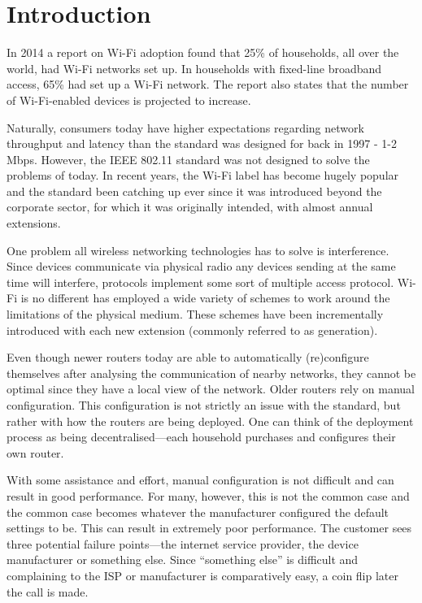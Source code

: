 \chapter{Introduction}

In 2014 a report on Wi-Fi adoption found that 25\% of households, all over the world, had Wi-Fi networks set up. In households with fixed-line broadband access, 65\% had set up a Wi-Fi network\cite{smith}. The report also states that the number of Wi-Fi-enabled devices is projected to increase. 

Naturally, consumers today have higher expectations regarding network throughput and latency than the standard was designed for back in 1997 - 1-2 Mbps. However, the IEEE 802.11 standard was not designed to solve the problems of today. In recent years, the Wi-Fi label has become hugely popular and the standard been catching up ever since it was introduced beyond the corporate sector, for which it was originally intended, with almost annual extensions.

One problem all wireless networking technologies has to solve is interference. Since devices communicate via physical radio any devices sending at the same time will interfere, protocols implement some sort of multiple access protocol. Wi-Fi is no different has employed a wide variety of schemes to work around the limitations of the physical medium. These schemes have been incrementally introduced with each new extension (commonly referred to as generation).

Even though newer routers today are able to automatically (re)configure themselves after analysing the communication of nearby networks, they cannot be optimal since they have a local view of the network. Older routers rely on manual configuration. This configuration is not strictly an issue with the standard, but rather with how the routers are being deployed. One can think of the deployment process as being decentralised—each household purchases and configures their own router. 

With some assistance and effort, manual configuration is not difficult and can result in good performance. For many, however, this is not the common case and the common case becomes whatever the manufacturer configured the default settings to be. This can result in extremely poor performance. The customer sees three potential failure points—the internet service provider, the device manufacturer or something else. Since ``something else'' is difficult and complaining to the ISP or manufacturer is comparatively easy, a coin flip later the call is made.

